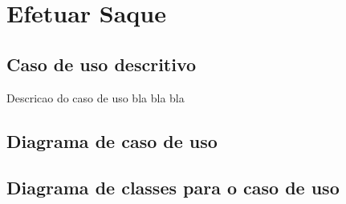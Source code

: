 
\section{Efetuar Saque}
\subsection{Caso de uso descritivo}
Descricao do caso de uso bla bla bla
\subsection{Diagrama de caso de uso}
\subsection{Diagrama de classes para o caso de uso}
